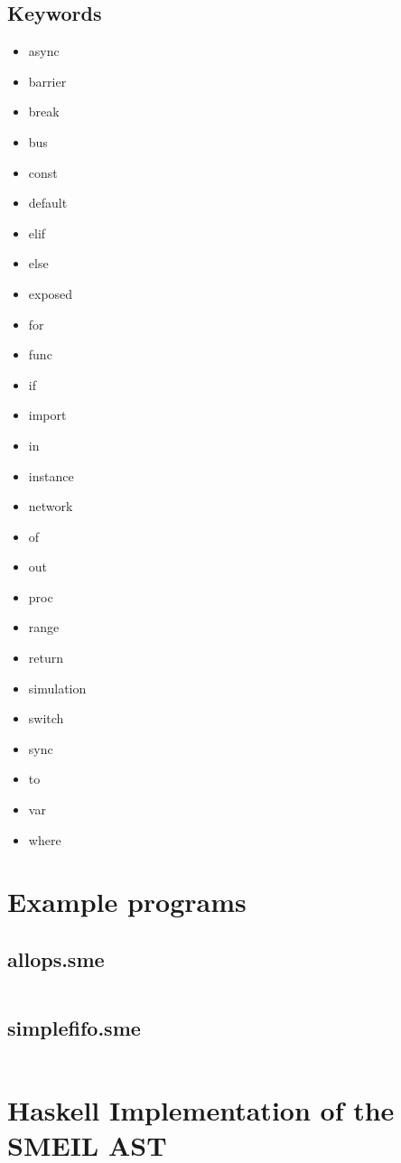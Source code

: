 \documentclass{article}
\begin{document}
\subsection{Keywords}
\begin{multicols}{3}
  \begin{itemize}
  \item async
  \item barrier
  \item break
  \item bus
  \item const
  \item default
  \item elif
  \item else
  \item exposed
  \item for
  \item func
  \item if
  \item import
  \item in
  \item instance
  \item network
  \item of
  \item out
  \item proc
  \item range
  \item return
  \item simulation
  \item switch
  \item sync
  \item to
  \item var
  \item where
  \end{itemize}
\end{multicols}

\section{Example programs}

\subsection{allops.sme}
\inputminted[fontsize=\small]{c}{samples/allops3.sme}

\subsection{simplefifo.sme}
\inputminted[fontsize=\small]{c}{samples/simplefifo.sme}

\newpage
\appendix
\section{Haskell Implementation of the SMEIL AST}
\label{hsast}
\inputminted[fontsize=\small]{haskell}{../../src/Language/SMEIL/Syntax.hs}
\end{document}
